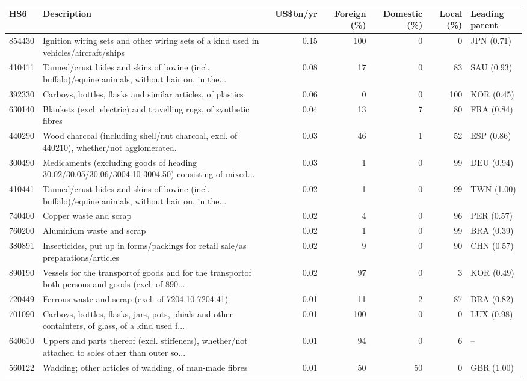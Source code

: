 \begin{tabular}{@{}l p{6.4cm} r r r r l@{}}
\toprule
HS6 & Description & US\$bn/yr & Foreign (\%) & Domestic (\%) & Local (\%) & Leading parent \\
\midrule
854430 & Ignition wiring sets and other wiring sets of a kind used in vehicles/\allowbreak{}aircraft/\allowbreak{}ships & 0.15 & 100 & 0 & 0 & JPN (0.71) \\
410411 & Tanned/\allowbreak{}crust hides and skins of bovine (incl. buffalo)/\allowbreak{}equine animals, without hair on, in the... & 0.08 & 17 & 0 & 83 & SAU (0.93) \\
392330 & Carboys, bottles, flasks and similar articles, of plastics & 0.06 & 0 & 0 & 100 & KOR (0.45) \\
630140 & Blankets (excl. electric) and travelling rugs, of synthetic fibres & 0.04 & 13 & 7 & 80 & FRA (0.84) \\
440290 & Wood charcoal (including shell/\allowbreak{}nut charcoal, excl. of 440210), whether/\allowbreak{}not agglomerated. & 0.03 & 46 & 1 & 52 & ESP (0.86) \\
300490 & Medicaments (excluding goods of heading 30.02/\allowbreak{}30.05/\allowbreak{}30.06/\allowbreak{}3004.10-3004.50) consisting of mixed... & 0.03 & 1 & 0 & 99 & DEU (0.94) \\
410441 & Tanned/\allowbreak{}crust hides and skins of bovine (incl. buffalo)/\allowbreak{}equine animals, without hair on, in the... & 0.02 & 1 & 0 & 99 & TWN (1.00) \\
740400 & Copper waste and scrap & 0.02 & 4 & 0 & 96 & PER (0.57) \\
760200 & Aluminium waste and scrap & 0.02 & 1 & 0 & 99 & BRA (0.39) \\
380891 & Insecticides, put up in forms/\allowbreak{}packings for retail sale/\allowbreak{}as preparations/\allowbreak{}articles  & 0.02 & 9 & 0 & 90 & CHN (0.57) \\
890190 & Vessels for the transportof goods and for the transportof both persons and goods (excl. of 890... & 0.02 & 97 & 0 & 3 & KOR (0.49) \\
720449 & Ferrous waste and scrap (excl. of 7204.10-7204.41) & 0.01 & 11 & 2 & 87 & BRA (0.82) \\
701090 & Carboys, bottles, flasks, jars, pots, phials and other containters, of glass, of a kind used f... & 0.01 & 100 & 0 & 0 & LUX (0.98) \\
640610 & Uppers and parts thereof (excl. stiffeners), whether/\allowbreak{}not attached to soles other than outer so... & 0.01 & 94 & 0 & 6 & -- \\
560122 & Wadding; other articles of wadding, of man-made fibres & 0.01 & 50 & 50 & 0 & GBR (1.00) \\
\bottomrule
\end{tabular}
